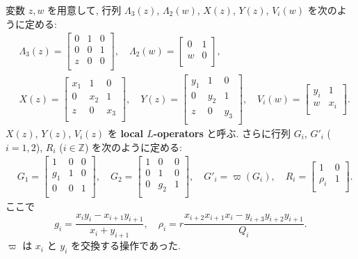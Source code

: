 \documentclass[12pt,twoside,dvipdfm]{msjproc}
\newcommand\Z{{\mathbb Z}} %
\theoremstyle{definition} %
\theoremstyle{definition} %
\theoremstyle{definition} %
\numberwithin{theorem}{section}
\numberwithin{equation}{section}
\numberwithin{figure}{section}
\numberwithin{table}{section}
\begin{document}
変数 $z,w$ を用意して, 
行列 $\Lambda_3(z)$, $\Lambda_2(w)$, $X(z)$, $Y(z)$, $V_i(w)$ を次のように定める:
\begin{align*}
 &
 \Lambda_3(z) =
 \begin{bmatrix}
  0 & 1 & 0 \\
  0 & 0 & 1 \\
  z & 0 & 0 \\
 \end{bmatrix},
 \quad
 \Lambda_2(w) =
 \begin{bmatrix}
  0 & 1 \\
  w & 0 \\
 \end{bmatrix},
 \\ &
 X(z) =
 \begin{bmatrix}
  x_1 & 1 & 0 \\
  0 & x_2 & 1 \\
  z & 0 & x_3 \\
 \end{bmatrix},
 \quad
 Y(z) =
 \begin{bmatrix}
  y_1 & 1 & 0 \\
  0 & y_2 & 1 \\
  z & 0 & y_3 \\
 \end{bmatrix},
 \quad
 V_i(w) =
 \begin{bmatrix}
  y_i &  1  \\
  w   & x_i \\
 \end{bmatrix}.
\end{align*}
$X(z)$, $Y(z)$, $V_i(z)$ を {\bf local $L$-operators} と呼ぶ.
さらに行列 $G_i$, $G'_i$ ($i=1,2$), $R_i$ ($i\in\Z$) を次のように定める:
\begin{align*}
 &
 G_1 =
 \begin{bmatrix}
  1   & 0 & 0 \\
  g_1 & 1 & 0 \\
  0 & 0 & 1 \\
 \end{bmatrix},
 \quad
 G_2 =
 \begin{bmatrix}
  1 & 0 & 0 \\
  0 & 1 & 0 \\
  0 & g_2 & 1 \\
 \end{bmatrix},
 \quad
 G'_i = \varpi(G_i),
 \quad
 R_i =
 \begin{bmatrix}
  1      & 0 \\
  \rho_i & 1 \\
 \end{bmatrix}.
\end{align*}
ここで
\begin{equation*}
 g_i = \frac{x_i y_i-x_{i+1}y_{i+1}}{x_i+y_{i+1}},
 \quad
 \rho_i = r \frac{x_{i+2}x_{i+1}x_{i}-y_{i+3}y_{i+2}y_{i+1}}{Q_i}.
\end{equation*}
$\varpi$ は $x_i$ と $y_i$ を交換する操作であった.
\end{document}
